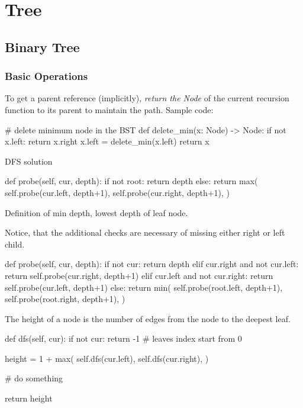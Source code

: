 \chapter{Tree}

\section{Binary Tree}
\subsection{Basic Operations}
 To get a parent reference (implicitly), \textit{return the Node} of the current recursion function to its parent to maintain the path. Sample code:
\begin{python}
# delete minimum node in the BST
def delete_min(x: Node) -> Node:
    if not x.left:
        return x.right
    x.left = delete_min(x.left)
    return x
\end{python}

 DFS solution
\begin{python}
def probe(self, cur, depth):
    if not root:
        return depth
    else:
        return max(
            self.probe(cur.left, depth+1), 
            self.probe(cur.right, depth+1),
      )
\end{python}

 Definition of min depth, lowest depth of leaf node. 

Notice, that the additional checks are necessary of missing either right or left child.
\begin{python}
def probe(self, cur, depth):
    if not cur: 
        return depth
    elif cur.right and not cur.left: 
        return self.probe(cur.right, depth+1)
    elif cur.left and not cur.right: 
        return self.probe(cur.left, depth+1)
    else: 
        return min(
            self.probe(root.left, depth+1), 
            self.probe(root.right, depth+1),
        )
\end{python}

 The height of a node is the number of edges from the node to the deepest leaf.

\begin{python}
def dfs(self, cur):
    if not cur:
        return -1  # leaves index start from 0

    height = 1 + max(
        self.dfs(cur.left), 
        self.dfs(cur.right),
    )
    
    # do something
     
    return height
\end{python}

